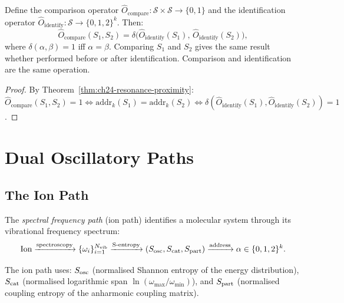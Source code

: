\begin{theorem}
\label{thm:ch24-commutation}
Define the comparison operator $\hat{O}_{\mathrm{compare}} :
\mathcal{S} \times \mathcal{S} \to \{0,1\}$ and the identification operator
$\hat{O}_{\mathrm{identify}} : \mathcal{S} \to \{0,1,2\}^k$.  Then:
\begin{equation}
\label{eq:ch24-commute}
  \hat{O}_{\mathrm{compare}}(S_1, S_2)
  = \delta\bigl(\hat{O}_{\mathrm{identify}}(S_1),\,
                \hat{O}_{\mathrm{identify}}(S_2)\bigr),
\end{equation}
where $\delta(\alpha, \beta) = 1$ iff $\alpha = \beta$.  Comparing
$S_1$ and $S_2$ gives the same result whether performed before or after
identification.  Comparison and identification are the same operation.
\end{theorem}

\begin{proof}
By Theorem~\ref{thm:ch24-resonance-proximity}:
$\hat{O}_{\mathrm{compare}}(S_1, S_2) = 1 \iff
\mathrm{addr}_k(S_1) = \mathrm{addr}_k(S_2) \iff
\delta(\hat{O}_{\mathrm{identify}}(S_1), \hat{O}_{\mathrm{identify}}(S_2)) = 1$.
\end{proof}

\section{Dual Oscillatory Paths}
\label{sec:ch24-dual}

\subsection{The Ion Path}
\label{sec:ch24-ion-path}

\begin{definition}
\label{def:ch24-ion-path}
The \emph{spectral frequency path} (ion path) identifies a molecular system
through its vibrational frequency spectrum:
\begin{equation}
\label{eq:ch24-ion-path}
  \text{Ion} \xrightarrow{\text{spectroscopy}}
  \{\omega_i\}_{i=1}^{N_{\mathrm{vib}}} \xrightarrow{\text{S-entropy}}
  (S_{\mathrm{osc}}, S_{\mathrm{cat}}, S_{\mathrm{part}}) \xrightarrow{\text{address}}
  \alpha \in \{0,1,2\}^k.
\end{equation}
\end{definition}

The ion path uses: $S_{\mathrm{osc}}$ (normalised Shannon entropy of the energy distribution),
$S_{\mathrm{cat}}$ (normalised logarithmic span $\ln(\omega_{\max}/\omega_{\min})$), and
$S_{\mathrm{part}}$ (normalised coupling entropy of the anharmonic coupling matrix).

